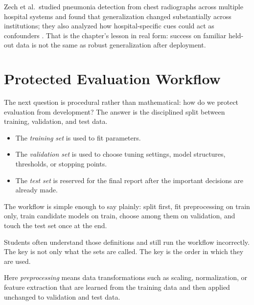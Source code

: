 \begin{evidencebox}
Zech et al.\ studied pneumonia detection from chest radiographs across multiple hospital systems and found that generalization changed substantially across institutions; they also analyzed how hospital-specific cues could act as confounders \citep{zech2018}. That is the chapter's lesson in real form: success on familiar held-out data is not the same as robust generalization after deployment.
\end{evidencebox}

\section{Protected Evaluation Workflow}

The next question is procedural rather than mathematical: how do we protect evaluation from development? The answer is the disciplined split between training, validation, and test data.

\begin{itemize}[leftmargin=*]
\item The \emph{training set} is used to fit parameters.
\item The \emph{validation set} is used to choose tuning settings, model structures, thresholds, or stopping points.
\item The \emph{test set} is reserved for the final report after the important decisions are already made.
\end{itemize}

\begin{practicalnote}
The workflow is simple enough to say plainly: split first, fit preprocessing on train only, train candidate models on train, choose among them on validation, and touch the test set once at the end.
\end{practicalnote}

Students often understand those definitions and still run the workflow incorrectly. The key is not only what the sets are called. The key is the order in which they are used.

Here \emph{preprocessing} means data transformations such as scaling, normalization, or feature extraction that are learned from the training data and then applied unchanged to validation and test data.

